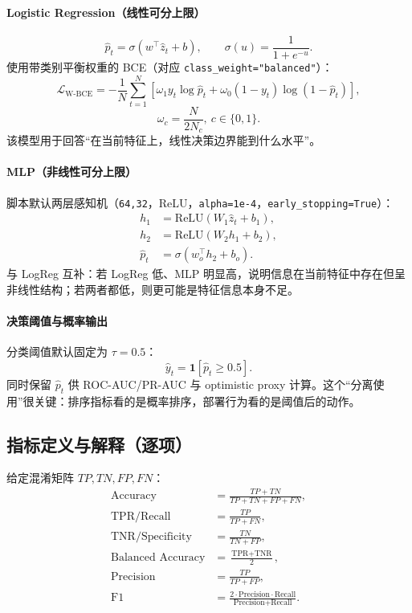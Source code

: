 ﻿\documentclass[11pt,a4paper]{ctexart}
\begin{document}
\paragraph{Logistic Regression（线性可分上限）}
\begin{equation}
\hat p_t=\sigma\left(w^\top \hat z_t+b\right),\qquad \sigma(u)=\frac{1}{1+e^{-u}}.
\end{equation}
使用带类别平衡权重的 BCE（对应 \texttt{class\_weight="balanced"}）：
\begin{equation}
\mathcal{L}_{\text{W-BCE}}
=-\frac{1}{N}\sum_{t=1}^N
\left[
\omega_1 y_t\log \hat p_t
+\omega_0(1-y_t)\log(1-\hat p_t)
\right],
\end{equation}
\begin{equation}
\omega_c=\frac{N}{2N_c},\ c\in\{0,1\}.
\end{equation}
该模型用于回答“在当前特征上，线性决策边界能到什么水平”。

\paragraph{MLP（非线性可分上限）}
脚本默认两层感知机（\texttt{64,32}，ReLU，\texttt{alpha=1e-4}，\texttt{early\_stopping=True}）：
\begin{align}
h_1&=\mathrm{ReLU}(W_1\hat z_t+b_1),\\
h_2&=\mathrm{ReLU}(W_2 h_1+b_2),\\
\hat p_t&=\sigma(w_o^\top h_2+b_o).
\end{align}
与 LogReg 互补：若 LogReg 低、MLP 明显高，说明信息在当前特征中存在但呈非线性结构；若两者都低，则更可能是特征信息本身不足。

\paragraph{决策阈值与概率输出}
分类阈值默认固定为 \(\tau=0.5\)：
\begin{equation}
\hat y_t=\mathbf{1}[\hat p_t\ge 0.5].
\end{equation}
同时保留 \(\hat p_t\) 供 ROC-AUC/PR-AUC 与 optimistic proxy 计算。这个“分离使用”很关键：排序指标看的是概率排序，部署行为看的是阈值后的动作。

\subsection{指标定义与解释（逐项）}
给定混淆矩阵 \(TP,TN,FP,FN\)：
\begin{align}
\text{Accuracy}&=\frac{TP+TN}{TP+TN+FP+FN},\\
\text{TPR/Recall}&=\frac{TP}{TP+FN},\\
\text{TNR/Specificity}&=\frac{TN}{TN+FP},\\
\text{Balanced Accuracy}&=\frac{\text{TPR}+\text{TNR}}{2},\\
\text{Precision}&=\frac{TP}{TP+FP},\\
\text{F1}&=\frac{2\cdot\text{Precision}\cdot\text{Recall}}{\text{Precision}+\text{Recall}}.
\end{align}
\end{document}
